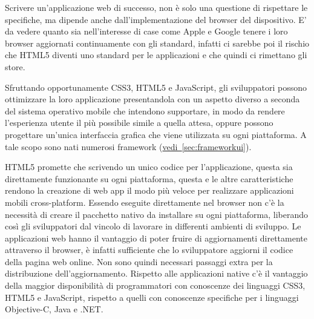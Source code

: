 		Scrivere un'applicazione web di successo, non è solo una questione di
		rispettare le specifiche, ma dipende anche dall'implementazione del 
		browser del dispositivo. E' da vedere quanto sia nell'interesse di case 
		come Apple e Google tenere i loro browser aggiornati continuamente con 
		gli standard, infatti ci sarebbe poi il rischio che HTML5 diventi uno 
		standard per le applicazioni e che quindi ci rimettano gli 
		store\citep{White:Native-vs-Html}. 

		Sfruttando opportunamente CSS3, HTML5 e JavaScript, gli sviluppatori 
		possono ottimizzare la loro applicazione presentandola con un aspetto 
		diverso a seconda del sistema operativo mobile che intendono supportare, 
		in modo da rendere l'esperienza utente il più possibile simile a quella 
		attesa, oppure possono progettare un'unica interfaccia grafica che viene 
		utilizzata su ogni piattaforma. A tale scopo sono nati numerosi 
		framework (\hyperref[sec:frameworkui]{vedi~\ref{sec:frameworkui}}).

		HTML5 promette che scrivendo un unico codice per l'applicazione, 
		questa sia direttamente funzionante su ogni piattaforma, questa e le altre caratteristiche
		rendono la creazione di web app il modo più veloce per realizzare applicazioni mobili  
		cross-platform. Essendo eseguite direttamente nel browser non c'è la 
		necessità di creare il pacchetto nativo da installare su ogni 
		piattaforma, liberando così gli sviluppatori dal vincolo di lavorare in 
		differenti ambienti di sviluppo. Le applicazioni web hanno il vantaggio 
		di poter fruire di aggiornamenti direttamente attraverso il browser, è 
		infatti sufficiente che lo sviluppatore aggiorni il codice della pagina 
		web online. Non sono quindi necessari passaggi extra per la 
		distribuzione dell'aggiornamento. Rispetto alle applicazioni native c'è 
		il vantaggio della maggior disponibilità di programmatori con conoscenze 
		dei linguaggi CSS3, HTML5 e JavaScript, rispetto a quelli con conoscenze 
		specifiche per i linguaggi Objective-C, Java e .NET.

